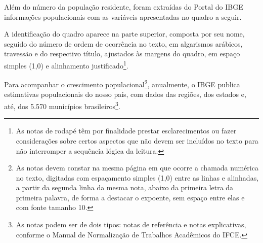 \newpage

Além do número da população residente, foram extraídas do Portal do IBGE informações populacionais com as variáveis apresentadas no quadro a seguir.

A identificação do quadro aparece na parte superior, composta por seu nome, seguido do número de ordem de ocorrência no texto, em algarismos arábicos, travessão e do respectivo título, ajustados às margens do quadro, em espaço simples (1,0) e alinhamento justificado\footnote{As notas de rodapé têm por finalidade prestar esclarecimentos ou fazer considerações sobre certos aspectos que não devem ser incluídos no texto para não interromper a sequência lógica da leitura.}.

\begin{quadro}[!ht]
    \centering
    \label{qua:exemplo-1}
\end{quadro}

\newpage

Para acompanhar o crescimento populacional\footnote{As notas devem constar na mesma página em que ocorre a chamada numérica no texto, digitadas com espaçamento simples (1,0) entre as linhas e alinhadas, a partir da segunda linha da mesma nota, abaixo da primeira letra da primeira palavra, de forma a destacar o expoente, sem espaço entre elas e com fonte tamanho 10.}, anualmente, o IBGE publica estimativas populacionais do nosso país, com dados das regiões, dos estados e, até, dos 5.570 municípios brasileiros\footnote{As notas podem ser de dois tipos: notas de referência e notas explicativas, conforme o Manual de Normalização de Trabalhos Acadêmicos do IFCE.}.